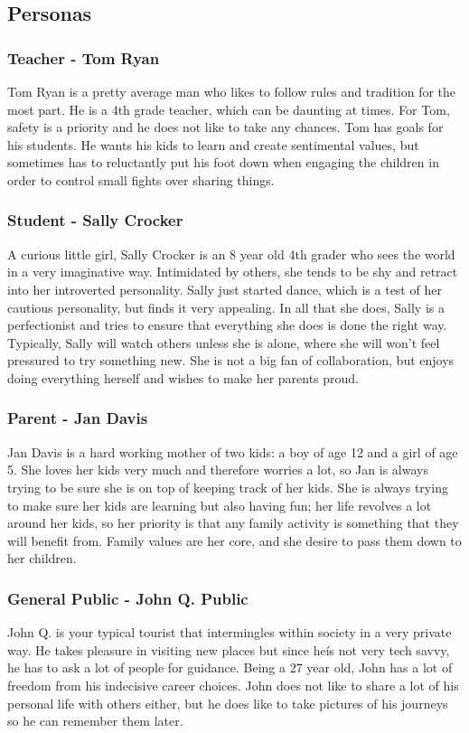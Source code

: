 \documentclass{tei2013}
\begin{document}
\subsection{Personas}

\subsubsection{Teacher - Tom Ryan}
Tom Ryan is a pretty average man who likes to follow rules and tradition for the most part. He is a 4th grade teacher, which can be daunting at times. For Tom, safety is a priority and he does not like to take any chances. Tom has goals for his students. He wants his kids to learn and create sentimental values, but sometimes has to reluctantly put his foot down when engaging the children in order to control small fights over sharing things. 

\subsubsection{Student - Sally Crocker}
A curious little girl, Sally Crocker is an 8 year old 4th grader who sees the world in a very imaginative way. Intimidated by others, she tends to be shy and retract into her introverted personality. Sally just started dance, which is a test of her cautious personality, but finds it very appealing. In all that she does, Sally is a perfectionist and tries to ensure that everything she does is done the right way. Typically, Sally will watch others unless she is alone, where she will won't feel pressured to try something new. She is not a big fan of collaboration, but enjoys doing everything herself and wishes to make her parents proud. 

\subsubsection{Parent - Jan Davis}
Jan Davis is a hard working mother of two kids: a boy of age 12 and a girl of age 5. She loves her kids very much and therefore worries a lot, so Jan is always trying to be sure she is on top of keeping track of her kids. She is always trying to make sure her kids are learning but also having fun; her life revolves a lot around her kids, so her priority is that any family activity is something that they will benefit from. Family values are her core, and she desire to pass them down to her children. 

\subsubsection{General Public - John Q. Public}
John Q. is your typical tourist that intermingles within society in a very private way. He takes pleasure in visiting new places but since heís not very tech savvy, he has to ask a lot of people for guidance. Being a 27 year old, John has a lot of freedom from his indecisive career choices. John does not like to share a lot of his personal life with others either, but he does like to take pictures of his journeys so he can remember them later. 
\end{document}
